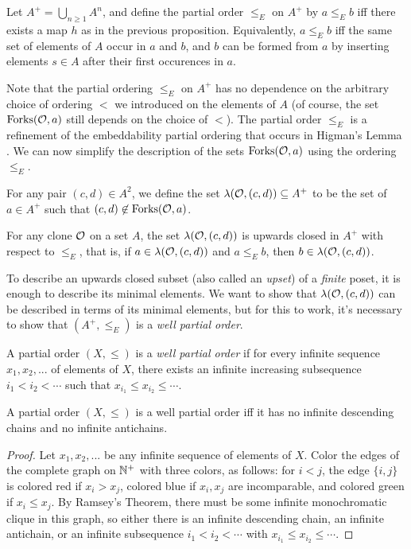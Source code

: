 \documentclass[letterpaper,11pt]{article}
\DeclareMathOperator{\Forks}{Forks}
\begin{document}
\begin{defn} Let $A^+ = \bigcup_{n \ge 1} A^n$, and define the partial order $\le_E$ on $A^+$ by $a \le_E b$ iff there exists a map $h$ as in the previous proposition. Equivalently, $a \le_E b$ iff the same set of elements of $A$ occur in $a$ and $b$, and $b$ can be formed from $a$ by inserting elements $s \in A$ after their first occurences in $a$.
\end{defn}

Note that the partial ordering $\le_E$ on $A^+$ has no dependence on the arbitrary choice of ordering $<$ we introduced on the elements of $A$ (of course, the set $\Forks(\cO,a)$ still depends on the choice of $<$). The partial order $\le_E$ is a refinement of the embeddability partial ordering that occurs in Higman's Lemma \cite{higmans-lemma}. We can now simplify the description of the sets $\Forks(\cO,a)$ using the ordering $\le_E$.

\begin{defn} For any pair $(c,d) \in A^2$, we define the set $\lambda(\mathcal{O},(c,d)) \subseteq A^+$ to be the set of $a \in A^+$ such that $(c,d) \not\in \Forks(\cO,a)$.
\end{defn}

\begin{cor} For any clone $\mathcal{O}$ on a set $A$, the set $\lambda(\mathcal{O},(c,d))$ is upwards closed in $A^+$ with respect to $\le_E$, that is, if $a \in \lambda(\mathcal{O},(c,d))$ and $a \le_E b$, then $b \in \lambda(\mathcal{O},(c,d))$.
\end{cor}

To describe an upwards closed subset (also called an \emph{upset}) of a \emph{finite} poset, it is enough to describe its minimal elements. We want to show that $\lambda(\mathcal{O},(c,d))$ can be described in terms of its minimal elements, but for this to work, it's necessary to show that $(A^+,\le_E)$ is a \emph{well partial order}.

\begin{defn} A partial order $(X,\le)$ is a \emph{well partial order} if for every infinite sequence $x_1, x_2, ...$ of elements of $X$, there exists an infinite increasing subsequence $i_1 < i_2 < \cdots$ such that $x_{i_1} \le x_{i_2} \le \cdots$. 
\end{defn}

\begin{prop} A partial order $(X,\le)$ is a well partial order iff it has no infinite descending chains and no infinite antichains.
\end{prop}
\begin{proof} Let $x_1, x_2, ...$ be any infinite sequence of elements of $X$. Color the edges of the complete graph on $\mathbb{N}^+$ with three colors, as follows: for $i < j$, the edge $\{i,j\}$ is colored red if $x_i > x_j$, colored blue if $x_i, x_j$ are incomparable, and colored green if $x_i \le x_j$. By Ramsey's Theorem, there must be some infinite monochromatic clique in this graph, so either there is an infinite descending chain, an infinite antichain, or an infinite subsequence $i_1 < i_2 < \cdots$ with $x_{i_1} \le x_{i_2} \le \cdots$.
\end{proof}
\end{document}
